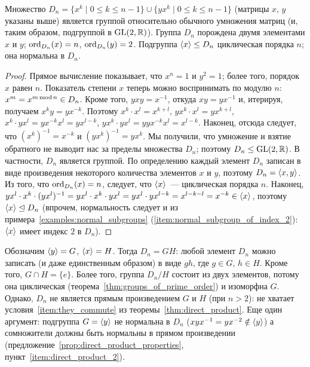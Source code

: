 \begin{theorem}
Множество $D_n = \{x^k\mid 0\leq k\leq n-1\}\cup\{yx^k\mid 0\leq k\leq
n-1\}$ (матрицы $x$, $y$ указаны выше) является группой относительно
обычного умножения матриц (и, таким образом, подгруппой в $\operatorname{GL}(2,\mathbb
R)$). Группа $D_n$ порождена двумя элементами $x$ и $y$;
$\operatorname{ord}_{D_n}(x)=n$, $\operatorname{ord}_{D_n}(y)=2$. Подгруппа $\langle x\rangle\leq D_n$
циклическая порядка $n$; она нормальна в $D_n$.
\end{theorem}
\begin{proof}
Прямое вычисление показывает, что $x^n=1$ и $y^2=1$; более того,
порядок $x$ равен $n$. Показатель степени $x$ теперь можно
воспринимать по модулю $n$: $x^m = x^{m\operatorname{mod} n}\in D_n$.
Кроме того, $yxy = x^{-1}$, откуда $xy =
yx^{-1}$ и, итерируя, получаем $x^ky = yx^{-k}$.
Поэтому $x^k\cdot x^l = x^{k+l}$, 
$yx^k\cdot x^l = yx^{k+l}$,
$x^k\cdot yx^l = yx^{-k}x^l = yx^{l-k}$,
$yx^k\cdot yx^l = yyx^{-k}x^l = x^{l-k}$.
Наконец, отсюда следует, что $(x^k)^{-1} = x^{-k}$ и
$(yx^k)^{-1} = yx^k$.
Мы получили, что умножение и взятие обратного не выводит нас за
пределы множества $D_n$; поэтому $D_n\leq\operatorname{GL}(2,\mathbb R)$. В частности,
$D_n$ является группой. По определению каждый элемент $D_n$ записан в
виде произведения некоторого количества элементов $x$ и $y$, поэтому
$D_n = \langle x,y\rangle$. Из того, что
$\operatorname{ord}_{D_n}(x) = n$, следует, что $\langle x\rangle$~--- циклическая порядка
$n$. Наконец, $yx^l\cdot x^k\cdot (yx^l)^{-1} =
yx^l\cdot x^k\cdot yx^l = yx^l\cdot yx^{l-k}=x^{l-k-l} = x^{-k}\in\langle
x\rangle$, поэтому $\langle x\rangle\trianglelefteq D_n$ (впрочем, нормальность следует и
из примера~\ref{examples:normal_subgroups}
(\ref{item:normal_subgroup_of_index_2}): $\langle x\rangle$ имеет индекс
$2$ в $D_n$).
\end{proof}

\begin{remark}
Обозначим $\langle y\rangle = G$, $\langle x\rangle = H$. Тогда $D_n = GH$: любой
элемент $D_n$ можно записать (и даже единственным образом) в виде
$gh$, где $g\in G$, $h\in H$. Кроме того, $G\cap H = \{e\}$. Более
того, группа $D_n/H$ состоит из двух элементов, потому она циклическая
(теорема~\ref{thm:groups_of_prime_order}) и изоморфна $G$. Однако, $D_n$ не является прямым
произведением $G$ и $H$ (при $n>2$): не хватает
условия~\ref{item:they_commute} из
теоремы~\ref{thm:direct_product}.
Еще один аргумент: подгруппа $G=\langle y\rangle$ не нормальна
в $D_n$ ($xyx^{-1} = yx^{-2}\notin \langle y\rangle$) а сомножители должны
быть нормальны в прямом произведении
(предложение~\ref{prop:direct_product_properties},
пункт~\ref{item:direct_product_2}).
\end{remark}
